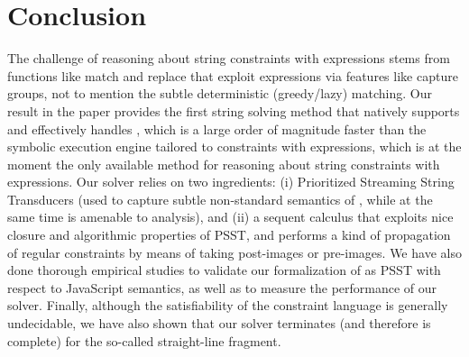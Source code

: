 
\section{Conclusion}\label{sec-related}
The challenge of reasoning about string constraints with \regexp{} expressions
stems from functions like match and replace that exploit \regexp{} expressions
via features like capture groups, not to mention the subtle deterministic
(greedy/lazy) matching. Our result in the paper provides the first string 
solving method that natively supports and effectively handles \regexp{}, which 
is a large order of magnitude faster than the symbolic execution engine 
\expose{} \cite{LMK19} tailored to constraints with \regexp{} expressions, 
which is at the moment the only available method for reasoning about string 
constraints with \regexp{} expressions. Our solver \ostrich{} relies on two ingredients: 
(i) Prioritized Streaming String Transducers (used to capture subtle non-standard
semantics of \regexp{}, while at the same time is amenable to analysis), and
(ii) a sequent calculus that exploits nice closure and algorithmic properties of
PSST, and performs a kind of propagation of regular constraints by means of 
taking post-images or pre-images. We have also done thorough empirical studies
to validate our formalization of \regexp{} as PSST with respect to JavaScript
semantics, as well as to measure the performance of our solver.
Finally, although the satisfiability of the constraint language is generally 
undecidable, we have also shown that our solver terminates (and therefore is
complete) for the so-called straight-line fragment.





 

